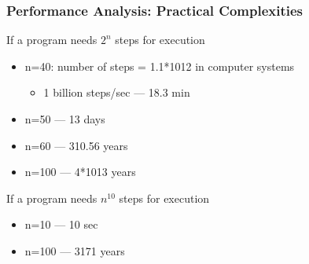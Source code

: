 \documentclass[newPxFont,sthlmFooter,nooffset]{beamer}
\begin{document}
\begin{frame}[t]
  \frametitle{Performance Analysis: Practical Complexities}

If a program needs $2^n$ steps for execution
\begin{itemize}
\item n=40: number of steps = 1.1*1012 in computer systems
  \begin{itemize}
  \item 1 billion steps/sec --- 18.3 min
  \end{itemize}
\item n=50 --- 13 days
\item n=60 --- 310.56 years
\item n=100 --- 4*1013 years
\end{itemize}

If a program needs $n^{10}$ steps for execution
\begin{itemize}
\item n=10 --- 10 sec
\item n=100 --- 3171 years
\end{itemize}

\end{frame}
\end{document}
